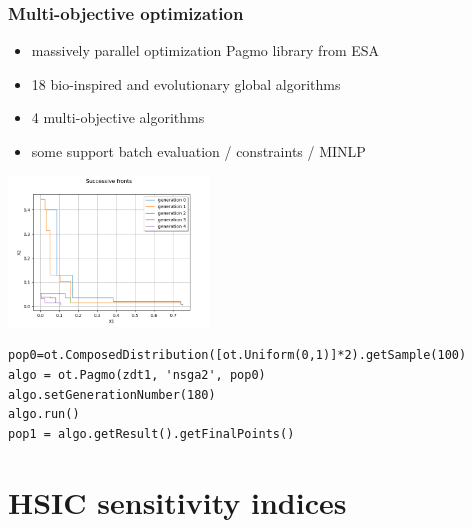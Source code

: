 \documentclass{beamer}
\begin{document}
\begin{frame}[containsverbatim]
\frametitle{Multi-objective optimization}

% 

\begin{itemize}
\item massively parallel optimization Pagmo library from ESA
\item 18 bio-inspired and evolutionary global algorithms
\item 4 multi-objective algorithms
\item some support batch evaluation / constraints / MINLP
\end{itemize}

\begin{center}
\includegraphics[width=0.4\textwidth]{figures/sphx_glr_plot_optimization_pagmo_002.png}
\end{center}

\begin{lstlisting}
pop0=ot.ComposedDistribution([ot.Uniform(0,1)]*2).getSample(100)
algo = ot.Pagmo(zdt1, 'nsga2', pop0)
algo.setGenerationNumber(180)
algo.run()
pop1 = algo.getResult().getFinalPoints()
\end{lstlisting}


\end{frame}


\section{HSIC sensitivity indices}
\end{document}
